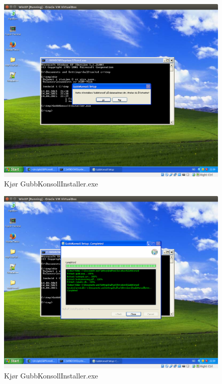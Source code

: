 \documentclass[12pt]{book}
\begin{document}
\begin{figure}[h]
\includegraphics[width=15cm]{005}
\caption{Kjør GubbKonsollInstaller.exe }
\end{figure}

\begin{figure}[h]
\includegraphics[width=15cm]{006}
\caption{Kjør GubbKonsollInstaller.exe }
\end{figure}
\end{document}
